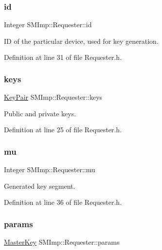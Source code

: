 \subsubsection{\texorpdfstring{id}{id}}
{\footnotesize\ttfamily Integer S\+M\+Imp\+::\+Requester\+::id}



ID of the particular device, used for key generation. 



Definition at line 31 of file Requester.\+h.

\mbox{\label{classSMImp_1_1Requester_a9203ce4677233f2dba858b5b6ec2d8be}} 
\subsubsection{\texorpdfstring{keys}{keys}}
{\footnotesize\ttfamily \hyperlink{structSMImp_1_1KeyPair}{Key\+Pair} S\+M\+Imp\+::\+Requester\+::keys}



Public and private keys. 



Definition at line 25 of file Requester.\+h.

\mbox{\label{classSMImp_1_1Requester_a2acc3ab496a01ff90429b95d6af6ef32}} 
\subsubsection{\texorpdfstring{mu}{mu}}
{\footnotesize\ttfamily Integer S\+M\+Imp\+::\+Requester\+::mu}



Generated key segment. 



Definition at line 36 of file Requester.\+h.

\mbox{\label{classSMImp_1_1Requester_a140f38a7e3106bf0df39eb6370fca2f0}} 
\subsubsection{\texorpdfstring{params}{params}}
{\footnotesize\ttfamily \hyperlink{structSMImp_1_1MasterKey}{Master\+Key} S\+M\+Imp\+::\+Requester\+::params}



